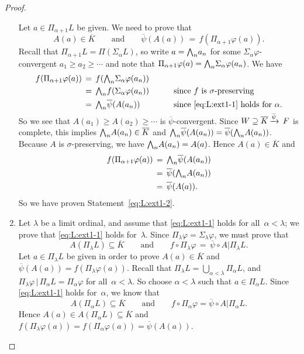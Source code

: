 \begin{proof}
\begin{enumerate}
Let $a\in \Pi_{\alpha+1} L$
be given. We need to prove that
\begin{equation}
\label{eq:L:ext1-2}
A(a)\in \overline{K}\qquad\text{and}\qquad
\overline\psi (A(a)) \,=\, f(\Pi_{\alpha+1}\varphi(a)).
\end{equation}
Recall that $\Pi_{\alpha+1}L = \Pi(\Sigma_\alpha L)$,
so write $a=\textstyle{\bigwedge}_n a_n$
for some 
$\Sigma_\alpha \varphi$-convergent
$a_1 \geq a_2 \geq \dotsb$
and note that $\Pi_{\alpha+1}\varphi (a) = \textstyle{\bigwedge}_n \Sigma_\alpha\varphi(a_n)$.
We have
\begin{alignat*}{3} 
f(\Pi_{\alpha+1}\varphi(a))
 \,&=\, f(\textstyle{\bigwedge}_n \Sigma_\alpha \varphi (a_n))
   && \\
 \,&=\, \textstyle{\bigwedge}_n f(\Sigma_\alpha\varphi(a_n))\qquad
   && \text{since $f$ is $\sigma$-preserving} \\
 \,&=\, \textstyle{\bigwedge}_n \overline{\psi} (A( a_n )) 
   && \text{since \eqref{eq:L:ext1-1} holds for~$\alpha$.} 
\end{alignat*}
So we see that $A(a_1)\geq A(a_2)\geq \dotsb$
is $\overline{\psi}$-convergent.
Since $W \supseteq \overline{K}\,\smash{\xrightarrow{\overline{\psi}}\,F}$ is complete,
this implies $\textstyle{\bigwedge}_n A(a_n) \in \overline{K}$
and $\textstyle{\bigwedge}_n\overline{\psi}(A(a_n))=\overline{\psi}(\textstyle{\bigwedge}_n A(a_n))$.
Because $A$ is $\sigma$-preserving,
we have $\textstyle{\bigwedge}_n A(a_n) = A(a)$.
Hence $A(a)\in \overline{K}$
and 
\begin{alignat*}{3}
f(\Pi_{\alpha+1}\varphi(a))
 \,&=\,  \textstyle{\bigwedge}_n \overline{\psi}(A(a_n)) \\
 \,&=\,  \overline{\psi} (\textstyle{\bigwedge}_n A(a_n)) \\
 \,&=\,  \overline{\psi} (A(a)).
\end{alignat*}
So we have proven Statement~\eqref{eq:L:ext1-2}.

\item
Let $\lambda$ be a limit ordinal,
and assume that \eqref{eq:L:ext1-1}
holds for all~$\alpha<\lambda$;
we prove that \eqref{eq:L:ext1-1} holds for~$\lambda$.
Since  $\Pi_\lambda \varphi = \Sigma_\lambda \varphi$,
we must prove that
\begin{equation}
A(\Pi_\lambda L)\subseteq \overline K
\qquad\text{and}\qquad
f\circ \Pi_\lambda \varphi \,=\, \overline\psi \circ A | \Pi_\lambda L.
\end{equation}
Let $a\in \Pi_\lambda L$ be given
in order to prove $A(a)\in \overline{K}$
and $\overline\psi(A(a))= f(\Pi_\lambda\varphi(a))$.
Recall that $\Pi_\lambda L = \bigcup_{\alpha < \lambda} \Pi_\alpha L$,
and $\Pi_\lambda \varphi \,|\,\Pi_\alpha L = \Pi_\alpha \varphi$
for all~$\alpha < \lambda$.
So choose $\alpha < \lambda$ such that
$a\in \Pi_\alpha L$.
Since \eqref{eq:L:ext1-1} holds for~$\alpha$,
we know that 
\begin{equation*}
A(\Pi_\alpha L) \subseteq \overline K
\qquad\text{and}\qquad
f\circ \Pi_\alpha \varphi = \overline\psi\circ A | \Pi_\alpha L.
\end{equation*}
Hence $A(a) \in A(\Pi_\alpha L) \subseteq \overline K$ and 
$f(\Pi_\lambda \varphi(a)) = f(\Pi_\alpha \varphi(a)) =
\overline\psi(A(a))$.\qedhere
\end{enumerate}
\end{proof}
